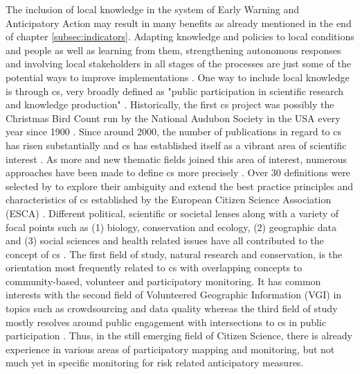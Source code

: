 The inclusion of local knowledge in the system of Early Warning and Anticipatory Action may result in many benefits as already mentioned in the end of chapter \ref{subsec:indicators}. Adapting knowledge and policies to local conditions and people as well as learning from them, strengthening autonomous responses and involving local stakeholders in all stages of the processes are just some of the potential ways to improve implementations \autocite{giordanoIntegrationLocalScientific2013a,idmpDroughtWaterScarcity2022,lackstromBackyardHydroclimatologyCitizen2022,lealfilhoRoleIndigenousKnowledge2022,lealfilhoUnderstandingResponsesClimaterelated2022}. One way to include local knowledge is through \acrfull{cs}, very broadly defined as "public participation in scientific research and knowledge production" \autocite[1]{fraislCitizenScienceEnvironmental2022}.\newline
Historically, the first \acrlong{cs} project was possibly the Christmas Bird Count run by the National Audubon Society in the USA every year since 1900 \autocite{linkHierarchicalModelRegional2006,silvertownNewDawnCitizen2009}. Since around 2000, the number of publications in regard to \acrshort{cs} has risen substantially and \acrshort{cs} has established itself as a vibrant area of scientific interest \autocite{kirschkeCitizenScienceProjects2022}. As more and new thematic fields joined this area of interest, numerous approaches have been made to define \acrshort{cs} more precisely \autocite{haklayWhatCitizenScience2021}.\newline
Over 30 definitions were selected by \textcite{haklayWhatCitizenScience2021} to explore their ambiguity and extend the best practice principles and characteristics of \acrshort{cs} established by the European Citizen Science Association (ESCA) \autocite{escaTenPrinciplesCitizen2015,escaECSACharacteristicsCitizen2020}. Different political, scientific or societal lenses along with a variety of focal points such as (1) biology, conservation and ecology, (2) geographic data and (3) social sciences and health related issues have all contributed to the concept of \acrlong{cs} \autocite{haklayWhatCitizenScience2021,kirschkeCitizenScienceProjects2022}. The first field of study, natural research and conservation, is the orientation most frequently related to \acrshort{cs} with overlapping concepts to community-based, volunteer and participatory monitoring. It has common interests with the second field of Volunteered Geographic Information (VGI) in topics such as crowdsourcing and data quality whereas the third field of study mostly resolves around public engagement with intersections to \acrshort{cs} in public participation \autocite{kullenbergWhatCitizenScience2016}. Thus, in the still emerging field of Citizen Science, there is already experience in various areas of participatory mapping and monitoring, but not much yet in specific monitoring for risk related anticipatory measures.

